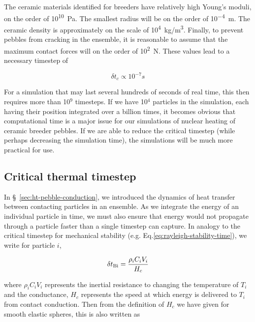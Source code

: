 The ceramic materials identified for breeders have relatively high Young's moduli, on the order of \si{10^{10} Pa}. The smallest radius will be on the order of \si{10^{-4} m}. The ceramic density is approximately on the scale of \si{10^{4} kg/m^3}. Finally, to prevent pebbles from cracking in the ensemble, it is reasonable to assume that the maximum contact forces will on the order of \si{10^2 N}. These values lead to a necessary timestep of

\begin{equation}
	\delta t_c \propto 10^{-7} \si{s}
\end{equation}

For a simulation that may last several hundreds of seconds of real time, this then requires more than 10$^9$ timesteps. If we have 10$^4$ particles in the simulation, each having their position integrated over a billion times, it becomes obvious that computational time is a major issue for our simulations of nuclear heating of ceramic breeder pebbles. If we are able to reduce the critical timestep (while perhaps decreasing the simulation time), the simulations will be much more practical for use.




\subsection{Critical thermal timestep}
In \S~\ref{sec:ht-pebble-conduction}, we introduced the dynamics of heat transfer between contacting particles in an ensemble. As we integrate the energy of an individual particle in time, we must also ensure that energy would not propagate through a particle faster than a single timestep can capture. In analogy to the critical timestep for mechanical stability (e.g. Eq.\ref{eq:rayleigh-stability-time}), we write for particle $i$,

\begin{equation}
	\delta t_{\mathrm{Bi}} = \frac{\rho_i C_i V_i}{H_c}
\end{equation}

where $\rho_i C_i V_i$ represents the inertial resistance to changing the temperature of $T_i$ and the conductance, $H_c$ represents the speed at which energy is delivered to $T_i$ from contact conduction. Then from the definition of $H_c$ we have given for smooth elastic spheres, this is also written as

